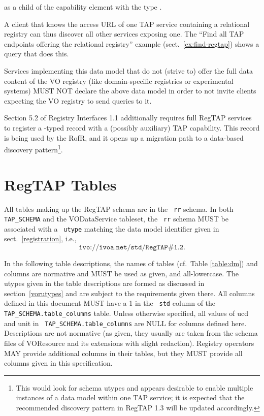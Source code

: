 \documentclass[11pt,a4paper]{ivoa}
\newcommand{\tapent}[1]{\texttt{\color{tapcolor} #1}}
\begin{document}
as a child of the capability element with the type
.

A client that knows the access URL of one TAP service containing
a relational
registry can thus discover all other services exposing one. The
``Find all TAP endpoints offering the
relational registry'' example (sect.~\ref{ex:find-regtap})
shows a query that does
this.

Services implementing this data model that do not (strive to) offer
the full data content of the VO registry (like domain-specific
registries or experimental systems) MUST NOT declare the above data
model in order to not invite clients expecting the VO registry to send
queries to it.

Section 5.2 of Registry Interfaces 1.1 additionally requires full RegTAP
services to register a -typed record with a (possibly
auxiliary) TAP capability.  This record is being used by the RofR, and
it opens up a migration path to a data-based discovery
pattern\footnote{This would look for schema utypes and appears
desirable to enable multiple instances of a data model within one TAP
service; it is expected that the recommended discovery pattern
in RegTAP 1.3 will be updated accordingly.}.




\section{RegTAP Tables}

\label{vortables}

All tables making up the RegTAP schema are in the \tapent{rr} schema.
In both \tapent{TAP\_SCHEMA} and the VODataService tableset, the
\tapent{rr} schema
MUST be associated with a \tapent{utype} matching the data model
identifier given in sect.~\ref{registration}, i.e.,
$$\texttt{ivo://ivoa.net/std/RegTAP\#1.2}.$$

In the following table descriptions, the names of tables
(cf.~Table \ref{table:dm}) and columns
are normative and MUST be used as given, and all-lowercase.  The utypes
given in the table descriptions are formed as discussed
in section~\ref{vorutypes} and are subject to the requirements given
there.  All columns defined in
this document MUST have a 1 in the \tapent{std} column of the
\tapent{TAP\_SCHEMA.table\_columns} table.  Unless otherwise
specified, all values of ucd and unit in
\tapent{TAP\_SCHEMA.table\_columns} are NULL for columns defined here.
Descriptions are not normative (as given, they usually are taken from
the schema files of VOResource and its extensions with slight
redaction).  Registry operators MAY provide additional columns in their
tables, but they MUST provide all columns given in this
specification.
\end{document}
